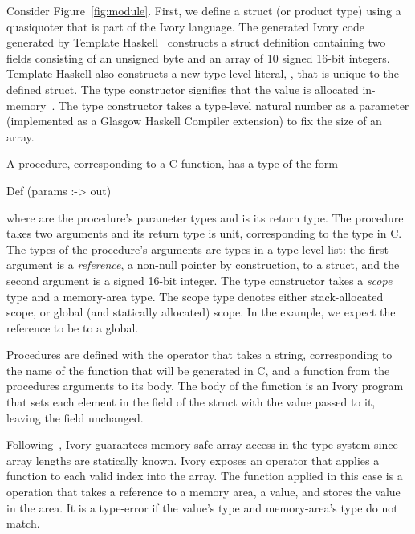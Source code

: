 Consider Figure~\ref{fig:module}. First, we define a struct (or product type)
using a quasiquoter that is part of the Ivory language.  The generated Ivory
code generated by Template Haskell~\cite{th} constructs a struct definition
containing two fields consisting of an unsigned byte and an array of 10 signed
16-bit integers.  Template Haskell also constructs a new type-level literal,
, that is unique to the defined struct.  The  type
constructor signifies that the value is allocated in-memory~\cite{memareas}.
The  type constructor takes a type-level natural number as a parameter
(implemented as a Glasgow Haskell Compiler extension) to fix the size of an
array.

A procedure, corresponding to a C function, has a type of the form
\begin{code}
Def (params :-> out)
\end{code}
\noindent
where  are the procedure's parameter types and  is its return
type.  The procedure  takes two arguments and its return type is
unit, corresponding to the  type in C.  The types of the procedure's
arguments are types in a type-level list: the first argument is a
\emph{reference}, a non-null pointer by construction, to a struct, and the
second argument is a signed 16-bit integer.  The  type constructor takes
a \emph{scope} type and a memory-area type.  The scope type denotes either
stack-allocated scope, or global (and statically allocated) scope.  In the
example, we expect the reference to be to a global.


Procedures are defined with the  operator that takes a string,
corresponding to the name of the function that will be generated in C, and a
function from the procedures arguments to its body.  The body of the function is
an Ivory program that sets each element in the  field of the struct with
the value  passed to it, leaving the  field unchanged.

Following~\cite{memareas}, Ivory guarantees memory-safe array access in the type
system since array lengths are statically known.  Ivory exposes an 
operator that applies a function to each valid index into the array.  The
function applied in this case is a  operation that takes a reference
to a memory area, a value, and stores the value in the area.  It is a type-error
if the value's type and memory-area's type do not match.

